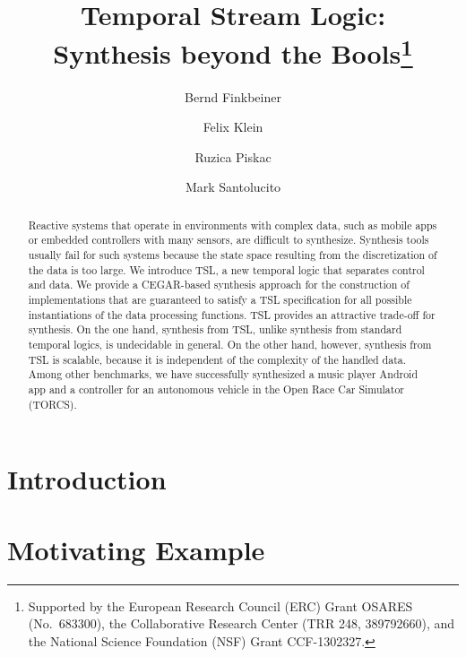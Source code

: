 \documentclass{llncs}
\begin{document}
\title{Temporal Stream Logic: \\[0.2em] Synthesis beyond the
  Bools\thanks{Supported by the European Research Council (ERC) Grant
    OSARES (No.\ 683300), the Collaborative Research Center (TRR 248,
    389792660), and the National Science Foundation (NSF) Grant
    CCF-1302327.}}

\author{
       Bernd Finkbeiner
  \and Felix Klein
  \and Ruzica Piskac
  \and Mark Santolucito
}


\maketitle

\begin{abstract}
  Reactive systems that operate in environments with complex data,
  such as mobile apps or embedded controllers with many sensors, are
  difficult to synthesize.  Synthesis tools usually fail for such
  systems because the state space resulting from the discretization
  of the data is too large.  We introduce TSL, a new temporal logic
  that separates control and data. We provide a CEGAR-based synthesis
  approach for the construction of implementations that are guaranteed
  to satisfy a TSL specification for all possible instantiations of
  the data processing functions.  TSL provides an attractive trade-off
  for synthesis. On the one hand, synthesis from TSL, unlike synthesis
  from standard temporal logics, is undecidable in general. On the
  other hand, however, synthesis from TSL is scalable, because it is
  independent of the complexity of the \mbox{handled} data.  Among
  other benchmarks, we have successfully synthesized a music player
  Android app and a controller for an autonomous vehicle in the Open
  Race Car Simulator (TORCS).
\end{abstract}

\section{Introduction}
\label{sec:intro}


\section{Motivating Example}
\label{sec:motiv}

\end{document}
